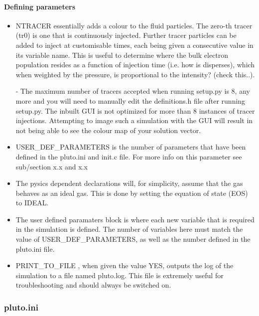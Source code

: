 \documentclass[12pt,a4paper]{report}
\begin{document}
\paragraph{Defining parameters}
\begin{itemize}
\item NTRACER essentially adds a colour to the fluid particles. The zero-th tracer (tr0)  is one that is continuously injected. Further tracer particles can be added to inject at customisable times, each being given a consecutive value in its variable name. This is useful to determine where the bulk electron population resides as a function of injection time (i.e. how is disperses), which when weighted by the pressure, is proportional to the intensity? (check this..). 

\subitem - The maximum number of tracers accepted when running setup.py is 8, any more and you will need to manually edit the definitions.h file after running setup.py. The inbuilt GUI is not optimized for more than 8 instances of tracer injections. Attempting to image such a simulation with the GUI will result in not being able to see the colour map of your solution vector.

\item USER\_DEF\_PARAMETERS is the number of parameters that have been defined in the pluto.ini and init.c file. For more info on this parameter see sub/section x.x and x.x 

\item The pysics dependent declarations will, for simplicity, assume that the gas behaves as an ideal gas. This is done by setting the equation of state (EOS) to IDEAL.

\item The user defined paramaters block is where each new variable that is required in the simulation is defined. The number of variables here must match the value of USER\_DEF\_PARAMETERS, as well as the number defined in the pluto.ini file.

 \item PRINT\_TO\_FILE , when given the value YES, outputs the log of the simulation to a file named pluto.log. This file is extremely useful for troubleshooting and should always be switched on.
\end{itemize}

\subsubsection{pluto.ini}
\end{document}
